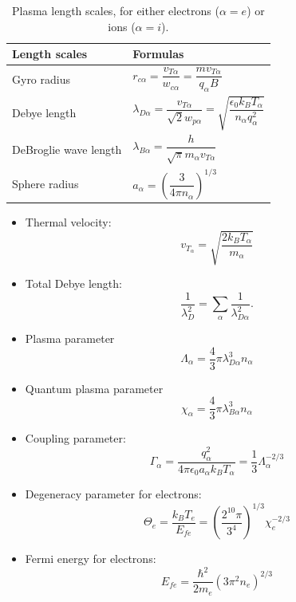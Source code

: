 \documentclass[oneside,a4paper,11pt]{report}
\begin{document}
\begin{table}[H]
\renewcommand{\arraystretch}{2.5}
\centering
\caption{Plasma length scales, for either electrons ($\alpha = e$) or ions ($\alpha = i$).}
\label{tb:plasma_length_scales}
 \begin{tabular}{l|l}
   Length scales & Formulas \\
   \hline
   Gyro radius  & $r_{c\alpha} = \dfrac{v_{T\alpha}}{w_{c\alpha}} = \dfrac{m v_{T\alpha}}{q_\alpha B}$ \\
   Debye length & $\lambda_{D\alpha} = \dfrac{v_{T\alpha}}{\sqrt{2} w_{p\alpha}} = \sqrt{ \dfrac{\epsilon_0 k_B T_\alpha}{ n_\alpha q_\alpha^2}}$ \\
   DeBroglie wave length & $\lambda_{B\alpha} = \dfrac{h}{\sqrt{\pi} m_\alpha v_{T\alpha}}$ \\
   Sphere radius & $a_\alpha = \left ( \dfrac{3}{4 \pi n_\alpha} \right )^{1/3}$
\end{tabular}
\end{table}

\begin{itemize}
\item Thermal velocity:
\begin{equation}
v_{T_\alpha} = \sqrt{\frac{2 k_B T_\alpha}{m_\alpha}}
\end{equation}

\item Total Debye length:
\begin{equation}
    \frac{1}{\lambda_D^2} = \sum_\alpha \frac{1}{\lambda_{D\alpha}^2}.
\end{equation}

\item Plasma parameter
\begin{equation}
    \Lambda_\alpha = \frac{4}{3} \pi \lambda_{D\alpha}^3 n_\alpha
\end{equation}

\item Quantum plasma parameter
\begin{equation}
    \chi_\alpha = \frac{4}{3} \pi \lambda_{B\alpha}^3 n_\alpha
\end{equation}

\item Coupling parameter:
\begin{equation}
    \Gamma_\alpha = \frac{q_\alpha^2}{4 \pi \epsilon_0 a_\alpha k_B T_\alpha} = \frac{1}{3} \Lambda_\alpha^{-2/3}
\end{equation}

\item Degeneracy parameter for electrons:
\begin{equation}
    \Theta_e = \frac{k_B T_e}{E_{fe}} = \left( \frac{2^{10} \pi}{3^4} \right)^{1/3} \chi_e^{-2/3}
\end{equation}

\item Fermi energy for electrons:
\begin{equation}
    E_{fe} = \frac{\hbar^2}{2m_e} \left ( 3 \pi^2 n_e \right)^{2/3}
\end{equation}
\end{itemize}
\end{document}

